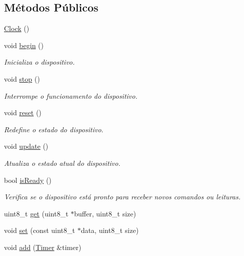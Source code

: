 \subsection*{Métodos Públicos}
\begin{DoxyCompactItemize}
\item 
\hyperlink{classClock_adbc370eb6b5f8d01645cf440188160a8}{Clock} ()
\item 
void \hyperlink{classClock_ad9e99b2538716b36b3a8fdc7d753f3a2}{begin} ()
\begin{DoxyCompactList}\small\item\em Inicializa o dispositivo. \end{DoxyCompactList}\item 
void \hyperlink{classClock_a0b77c3e7f33eb7ae0f018e469d96a250}{stop} ()
\begin{DoxyCompactList}\small\item\em Interrompe o funcionamento do dispositivo. \end{DoxyCompactList}\item 
void \hyperlink{classClock_a0ab5423b0a997aa13d7b6131c46d1358}{reset} ()
\begin{DoxyCompactList}\small\item\em Redefine o estado do dispositivo. \end{DoxyCompactList}\item 
void \hyperlink{classClock_ae7c6708cf04b233655b501a97bb1e802}{update} ()
\begin{DoxyCompactList}\small\item\em Atualiza o estado atual do dispositivo. \end{DoxyCompactList}\item 
bool \hyperlink{classClock_a16ee92e4eb0c0e3fcb7880b1256fd5ec}{is\-Ready} ()
\begin{DoxyCompactList}\small\item\em Verifica se o dispositivo está pronto para receber novos comandos ou leituras. \end{DoxyCompactList}\item 
uint8\-\_\-t \hyperlink{classClock_a3027e265e43f1d6e07d390c65aef5ecb}{get} (uint8\-\_\-t $\ast$buffer, uint8\-\_\-t size)
\item 
void \hyperlink{classClock_a296c2478ec80555af73955e09777fa5e}{set} (const uint8\-\_\-t $\ast$data, uint8\-\_\-t size)
\item 
void \hyperlink{classClock_ada8bcb5827416803dc9c7379604c18d1}{add} (\hyperlink{Clock_8h_ae646ae1606f53892b8112edd8f8ab903}{Timer} \&timer)

\end{DoxyCompactItemize}
